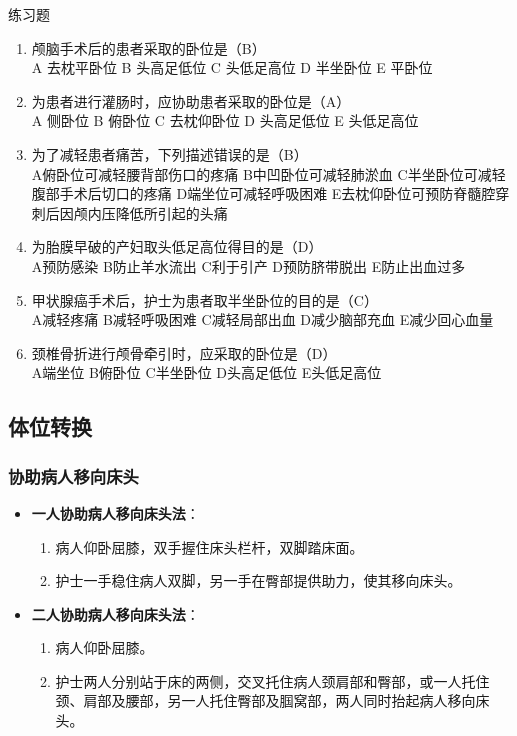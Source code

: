 \documentclass[11pt, a4paper]{ctexart}
\begin{document}
\begin{examplebox}{练习题}
\begin{enumerate}
    \item 颅脑手术后的患者采取的卧位是（B）\\
    A 去枕平卧位 \quad B 头高足低位 \quad C 头低足高位 \quad D 半坐卧位 \quad E 平卧位
    \item 为患者进行灌肠时，应协助患者采取的卧位是（A）\\
    A 侧卧位 \quad B 俯卧位 \quad C 去枕仰卧位 \quad D 头高足低位 \quad E 头低足高位
    \item 为了减轻患者痛苦，下列描述错误的是（B）\\
    A俯卧位可减轻腰背部伤口的疼痛 \quad B中凹卧位可减轻肺淤血 \quad C半坐卧位可减轻腹部手术后切口的疼痛 \quad D端坐位可减轻呼吸困难 \quad E去枕仰卧位可预防脊髓腔穿刺后因颅内压降低所引起的头痛
    \item 为胎膜早破的产妇取头低足高位得目的是（D）\\
    A预防感染 \quad B防止羊水流出 \quad C利于引产 \quad D预防脐带脱出 \quad E防止出血过多
    \item 甲状腺癌手术后，护士为患者取半坐卧位的目的是（C）\\
    A减轻疼痛 \quad B减轻呼吸困难 \quad C减轻局部出血 \quad D减少脑部充血 \quad E减少回心血量
    \item 颈椎骨折进行颅骨牵引时，应采取的卧位是（D）\\
    A端坐位 \quad B俯卧位 \quad C半坐卧位 \quad D头高足低位 \quad E头低足高位
\end{enumerate}
\end{examplebox}

\subsection{体位转换}
\subsubsection{协助病人移向床头}
\begin{itemize}
    \item \textbf{一人协助病人移向床头法}：
    \begin{enumerate}
        \item 病人仰卧屈膝，双手握住床头栏杆，双脚踏床面。
        \item 护士一手稳住病人双脚，另一手在臀部提供助力，使其移向床头。
    \end{enumerate}
    \item \textbf{二人协助病人移向床头法}：
    \begin{enumerate}
        \item 病人仰卧屈膝。
        \item 护士两人分别站于床的两侧，交叉托住病人颈肩部和臀部，或一人托住颈、肩部及腰部，另一人托住臀部及腘窝部，两人同时抬起病人移向床头。
    \end{enumerate}
\end{itemize}
\end{document}
